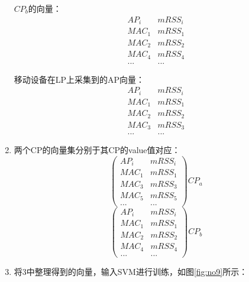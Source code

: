 \documentclass[UTF8, twocolumn ]{ctexart}
\begin{document}
\begin{enumerate}
\begin{displaymath}
  \end{displaymath}
  \par
  $CP_{b}$的向量：
  \begin{displaymath}
    \begin{array}{c|c}
      AP_{i} & mRSS_{i} \\ \hline
      MAC_{1} & mRSS_{1} \\
      MAC_{2} & mRSS_{2} \\
      MAC_{4} & mRSS_{4} \\
      ... & ...
    \end{array}
  \end{displaymath}
  \par
  移动设备在LP上采集到的AP向量：
  \begin{displaymath}
    \begin{array}{c|c}
      AP_{i} & mRSS_{i} \\ \hline
      MAC_{1} & mRSS_{1} \\
      MAC_{2} & mRSS_{2} \\
      MAC_{3} & mRSS_{3} \\
      ... & ...
    \end{array}
  \end{displaymath}
\item 两个CP的向量集分别于其CP的value值对应：
  \begin{displaymath}
    \left(
    \begin{array}{c|c}
      AP_{i} & mRSS_{i} \\ \hline
      MAC_{1} & mRSS_{1} \\
      MAC_{3} & mRSS_{3} \\
      MAC_{5} & mRSS_{5} \\
      ... & ...
    \end{array}
    \right)CP_{a}
  \end{displaymath}
  \begin{displaymath}
    \left(
    \begin{array}{c|c}
      AP_{i} & mRSS_{i} \\ \hline
      MAC_{1} & mRSS_{1} \\
      MAC_{2} & mRSS_{2} \\
      MAC_{4} & mRSS_{4} \\
      ... & ...
    \end{array}
    \right)CP_{b}
  \end{displaymath}
\item 将3中整理得到的向量，输入SVM进行训练，如图\ref{fig:no9}所示：
  \begin{figure}[!ht]\centering

\end{figure}
\end{enumerate}
\end{document}
